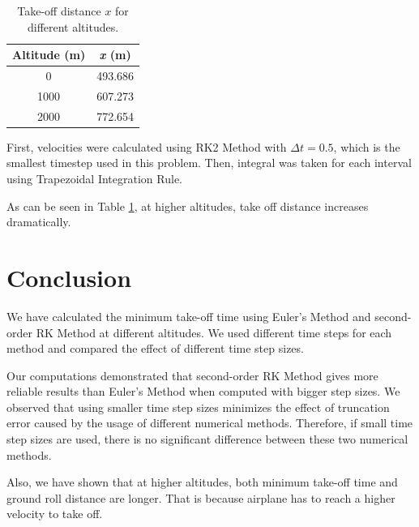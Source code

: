 \documentclass[letterpaper,12pt]{article}
\begin{document}
\begin{table}[!h]
        \begin{center}
        \caption{Take-off distance $x$ for different altitudes.}
        \vspace{1em}
        \label{tbl:takeoff}
        \begin{tabular}{|c|c|} 
        \hline
        \multicolumn{1}{|c|}{\bf{Altitude (m)}} & \multicolumn{1}{c|}{\bf{\textit{x} (m)}} \\
        \hline
        0 &   493.686 \\ \hline
        1000 &   607.273 \\ \hline
        2000 &   772.654 \\ \hline
        \end{tabular}
        \end{center}
\end{table}

First, velocities were calculated using RK2 Method with $\Delta t = 0.5$, which is the smallest
timestep used in this problem. Then, integral was taken for each interval using Trapezoidal Integration Rule.

As can be seen in Table \ref{tbl:takeoff}, at higher altitudes, take off distance increases dramatically.

\section{Conclusion}
We have calculated the minimum take-off time using Euler's Method and second-order RK Method at different altitudes.
We used different time steps for each method and compared the effect of different time step sizes. 

Our computations demonstrated that second-order RK Method gives more reliable results than Euler's Method
when computed with bigger step sizes. We observed that using smaller time step sizes minimizes the effect of truncation error
caused by the usage of different numerical methods. Therefore, if small time step sizes are used, there is no 
significant difference between these two numerical methods.

Also, we have shown that at higher altitudes, both minimum take-off time and ground roll distance are longer.
That is because airplane has to reach a higher velocity to take off.
\end{document}

